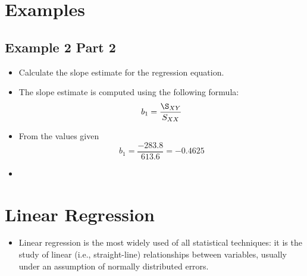 \documentclass[]{report}
\begin{document}
\section{Examples}









\subsection{Example 2 Part 2}
\begin{itemize}
	\item Calculate the slope estimate for the regression equation.
	\item The slope estimate is computed using the following formula:
	\[ b_1 = \frac{\S_{XY}}{S_{XX}} \]
	\item From the values given
	\[ b_1 = \frac{-283.8}{613.6} =-0.4625 \]
	\item 
\end{itemize}




	\section*{Linear Regression}
	\begin{itemize}
		\item Linear regression is the most widely used of all statistical techniques: it is the study of linear (i.e., straight-line) relationships between variables, usually under an assumption of normally distributed errors.
	\end{itemize}
\end{document}
